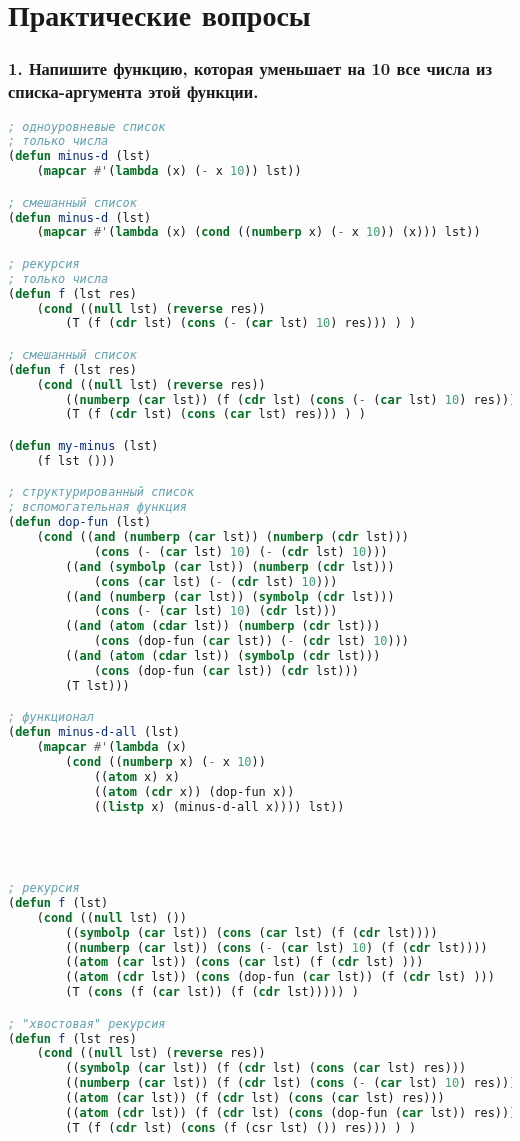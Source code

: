 \section*{Практические вопросы}


\subsubsection*{1. Напишите функцию, которая уменьшает на 10 все числа из списка-аргумента этой функции.}
\begin{lstlisting}[language=Lisp]
; одноуровневые список
; только числа
(defun minus-d (lst)
	(mapcar #'(lambda (x) (- x 10)) lst))

; смешанный список
(defun minus-d (lst)
	(mapcar #'(lambda (x) (cond ((numberp x) (- x 10)) (x))) lst))

; рекурсия
; только числа
(defun f (lst res)
	(cond ((null lst) (reverse res))
		(T (f (cdr lst) (cons (- (car lst) 10) res))) ) )

; смешанный список
(defun f (lst res)
	(cond ((null lst) (reverse res))
		((numberp (car lst)) (f (cdr lst) (cons (- (car lst) 10) res)))
		(T (f (cdr lst) (cons (car lst) res))) ) )

(defun my-minus (lst)
	(f lst ()))

; структурированный список
; вспомогательная функция
(defun dop-fun (lst)
	(cond ((and (numberp (car lst)) (numberp (cdr lst))) 
			(cons (- (car lst) 10) (- (cdr lst) 10)))
		((and (symbolp (car lst)) (numberp (cdr lst))) 
			(cons (car lst) (- (cdr lst) 10)))
		((and (numberp (car lst)) (symbolp (cdr lst))) 
			(cons (- (car lst) 10) (cdr lst)))
		((and (atom (cdar lst)) (numberp (cdr lst))) 
			(cons (dop-fun (car lst)) (- (cdr lst) 10)))
		((and (atom (cdar lst)) (symbolp (cdr lst))) 
			(cons (dop-fun (car lst)) (cdr lst)))
		(T lst)))

; функционал
(defun minus-d-all (lst)
	(mapcar #'(lambda (x) 
		(cond ((numberp x) (- x 10))
			((atom x) x)
			((atom (cdr x)) (dop-fun x))
			((listp x) (minus-d-all x)))) lst))




; рекурсия
(defun f (lst)
	(cond ((null lst) ())
		((symbolp (car lst)) (cons (car lst) (f (cdr lst))))
		((numberp (car lst)) (cons (- (car lst) 10) (f (cdr lst))))
		((atom (car lst)) (cons (car lst) (f (cdr lst) )))
		((atom (cdr lst)) (cons (dop-fun (car lst)) (f (cdr lst) )))
		(T (cons (f (car lst)) (f (cdr lst))))) )

; "хвостовая" рекурсия
(defun f (lst res)
	(cond ((null lst) (reverse res))
		((symbolp (car lst)) (f (cdr lst) (cons (car lst) res)))
		((numberp (car lst)) (f (cdr lst) (cons (- (car lst) 10) res)))
		((atom (car lst)) (f (cdr lst) (cons (car lst) res)))
		((atom (cdr lst)) (f (cdr lst) (cons (dop-fun (car lst)) res)))
		(T (f (cdr lst) (cons (f (csr lst) ()) res))) ) )

\end{lstlisting}

